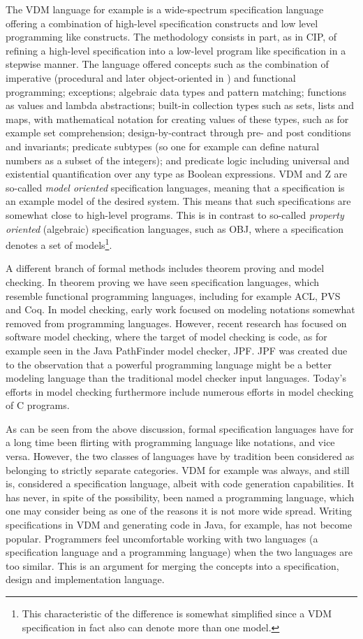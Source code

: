 The VDM language for example is a wide-spectrum specification 
language offering a combination of high-level specification 
constructs and low level programming like constructs. The 
methodology 
consists in part, as in CIP, of refining a high-level specification 
into a low-level program like specification in a stepwise manner. 
The language offered concepts 
such as the combination of imperative (procedural and later 
object-oriented in \vdmpp) and functional programming; exceptions; 
algebraic data types and pattern matching; functions as values and 
lambda abstractions; built-in collection types such as sets, lists 
and maps, with mathematical notation for creating values of these 
types, such as for example set comprehension; design-by-contract 
through pre- and post conditions and invariants; predicate subtypes 
(so one for example can define natural numbers as a subset of the 
integers);  and predicate logic including universal and existential 
quantification over any type as Boolean expressions.  VDM and Z are 
so-called {\em model oriented} specification languages, 
meaning that a specification is an example model of the desired system. This means that such specifications are somewhat close to high-level programs. This is in contrast to so-called {\em property oriented} (algebraic) specification languages, such as OBJ, where a specification denotes a set of models\footnote{This characteristic of the difference is somewhat simplified since a VDM specification in fact also can denote more than one model.}.  

A different branch of formal methods includes theorem proving and 
model checking. In theorem proving we have seen specification 
languages, which resemble functional programming languages, 
including for example ACL, PVS and Coq. In model checking, early 
work focused on modeling notations somewhat removed from 
programming languages. However, recent research has focused on 
software model checking, where the target of model checking is 
code, as for example seen in the Java PathFinder model checker, 
JPF. JPF was created due to the observation that a powerful 
programming language might be a better modeling language than the 
traditional model checker input languages. Today’s 
efforts in model checking furthermore include numerous efforts in 
model checking of C programs.

As can be seen from the above discussion, formal specification 
languages have for a long time been flirting with programming 
language like notations, and vice versa. However, the two classes of languages have by tradition been considered as belonging to 
strictly separate categories. VDM for example was always, and still 
is, considered a specification language, albeit with code 
generation capabilities. It has never, in spite of the possibility, 
been named a programming language, which one may 
consider being as one of the reasons it is not more wide spread. 
Writing specifications in VDM and generating code in Java, for 
example, has not become popular. Programmers feel uncomfortable 
working with two languages (a specification language and  a 
programming language) when the two languages are too similar. This 
is an argument for merging the concepts into a  specification, 
design and implementation language.


